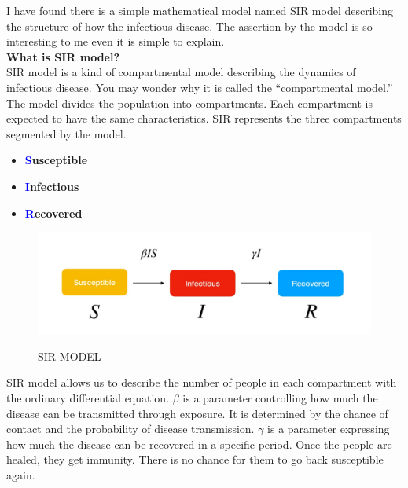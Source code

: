 \documentclass[12pt]{article}
\begin{document}
\par I have found there is a simple mathematical model named SIR model describing the structure of how the infectious disease. The assertion by the model is so interesting to me even it is simple to explain. \\
[1 cm]
{\bf{ What is SIR model?}}\\
[5 mm]
SIR model is a kind of compartmental model describing the dynamics of infectious disease. You may wonder why it is called the “compartmental model.” The model divides the population into compartments. Each compartment is expected to have the same characteristics. SIR represents the three compartments segmented by the model.\cite{nj6}\\
[5 mm]
\begin{itemize}
\item\bf\textcolor{blue}{S}usceptible\\
\item  \bf \textcolor{blue}{I}nfectious \\
\item \bf \textcolor{blue}{R}ecovered\\
\end{itemize} 
\begin{figure}[h]
\includegraphics[width=\textwidth]{SIR.jpeg}\\
\caption{SIR MODEL\cite{nj6}}
\end{figure}

\newpage
SIR model allows us to describe the number of people in each compartment with the ordinary differential equation. 
$\beta$
 is a parameter controlling how much the disease can be transmitted through exposure. It is determined by the chance of contact and the probability of disease transmission. 
$\gamma$
 is a parameter expressing how much the disease can be recovered in a specific period. Once the people are healed, they get immunity. There is no chance for them to go back susceptible again.\\
\end{document}
